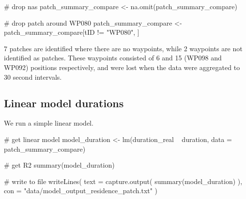 \documentclass[]{scrreprt}
\newenvironment{Shaded}{}{}
\newcommand{\CommentTok}[1]{\textcolor[rgb]{0.00,0.50,0.00}{#1}}
\newcommand{\DataTypeTok}[1]{#1}
\newcommand{\KeywordTok}[1]{\textcolor[rgb]{0.00,0.00,1.00}{#1}}
\newcommand{\NormalTok}[1]{#1}
\newcommand{\OperatorTok}[1]{#1}
\newcommand{\StringTok}[1]{\textcolor[rgb]{0.00,0.50,0.50}{#1}}
\begin{document}
\begin{Shaded}
\begin{Highlighting}[]
\CommentTok{# drop nas}
\NormalTok{patch_summary_compare <-}\StringTok{ }\KeywordTok{na.omit}\NormalTok{(patch_summary_compare)}

\CommentTok{# drop patch around WP080}
\NormalTok{patch_summary_compare <-}\StringTok{ }\NormalTok{patch_summary_compare[tID }\OperatorTok{!=}\StringTok{ "WP080"}\NormalTok{, ]}
\end{Highlighting}
\end{Shaded}

7 patches are identified where there are no waypoints, while 2 waypoints are not identified as patches. These waypoints consisted of 6 and 15 (WP098 and WP092) positions respectively, and were lost when the data were aggregated to 30 second intervals.

\hypertarget{linear-model-durations}{%
\subsection{Linear model durations}\label{linear-model-durations}}

We run a simple linear model.

\begin{Shaded}
\begin{Highlighting}[]
\CommentTok{# get linear model}
\NormalTok{model_duration <-}\StringTok{ }\KeywordTok{lm}\NormalTok{(duration_real }\OperatorTok{~}\StringTok{ }\NormalTok{duration,}
                     \DataTypeTok{data =}\NormalTok{ patch_summary_compare)}

\CommentTok{# get R2}
\KeywordTok{summary}\NormalTok{(model_duration)}

\CommentTok{# write to file}
\KeywordTok{writeLines}\NormalTok{(}
  \DataTypeTok{text =} \KeywordTok{capture.output}\NormalTok{(}
    \KeywordTok{summary}\NormalTok{(model_duration)}
\NormalTok{  ),}
  \DataTypeTok{con =} \StringTok{"data/model_output_residence_patch.txt"}
\NormalTok{)}
\end{Highlighting}
\end{Shaded}
\end{document}
